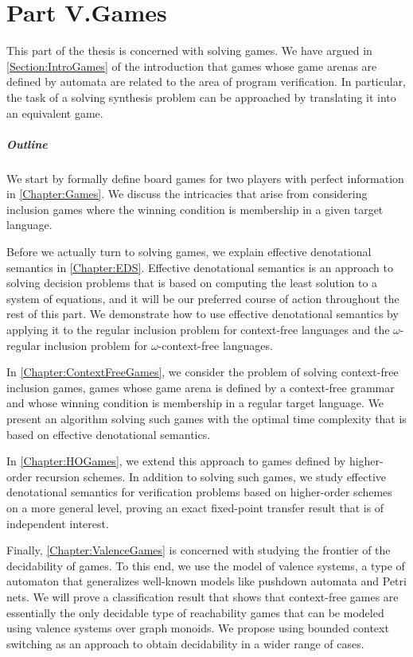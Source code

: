 \documentclass[../../diss.tex]{subfiles}
\begin{document}
\chapter*{Part V.\newline Games}

This part of the thesis is concerned with solving games.
We have argued in \cref{Section:IntroGames} of the introduction that games whose game arenas are defined by automata are related to the area of program verification.
In particular, the task of a solving synthesis problem can be approached by translating it into an equivalent game.

\paragraph{Outline}

We start by formally define board games for two players with perfect information in \cref{Chapter:Games}.
We discuss the intricacies that arise from considering inclusion games where the winning condition is membership in a given target language.

Before we actually turn to solving games, we explain effective denotational semantics in \cref{Chapter:EDS}.
Effective denotational semantics is an approach to solving decision problems that is based on computing the least solution to a system of equations, and it will be our preferred course of action throughout the rest of this part.
We demonstrate how to use effective denotational semantics by applying it to the regular inclusion problem for context-free languages and the $\omega$-regular inclusion problem for $\omega$-context-free languages.

In \cref{Chapter:ContextFreeGames}, we consider the problem of solving context-free inclusion games, games whose game arena is defined by a context-free grammar and whose winning condition is membership in a regular target language.
We present an algorithm solving such games with the optimal time complexity that is based on effective denotational semantics.

In \cref{Chapter:HOGames}, we extend this approach to games defined by higher-order recursion schemes.
In addition to solving such games, we study effective denotational semantics for verification problems based on higher-order schemes on a more general level, proving an exact fixed-point transfer result that is of independent interest.

Finally, \cref{Chapter:ValenceGames} is concerned with studying the frontier of the decidability of games.
To this end, we use the model of valence systems, a type of automaton that generalizes well-known models like pushdown automata and Petri nets.
We will prove a classification result that shows that context-free games are essentially the only decidable type of reachability games that can be modeled using valence systems over graph monoids.
We propose using bounded context switching as an approach to obtain decidability in a wider range of cases.
\end{document}
